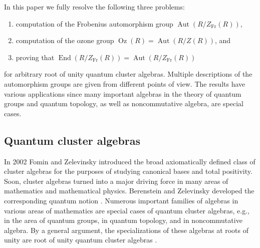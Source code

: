 \documentclass[11pt]{amsart}
\theoremstyle{plain}
\DeclareMathOperator \Aut { {\mathrm{Aut}} }
\DeclareMathOperator \Oz { {\mathrm{Oz}}}
\DeclareMathOperator \End { {\mathrm{End}} }
\DeclareMathOperator \Fr { {\mathrm{Fr}}}
\begin{document}
In this paper we fully resolve the following three problems:
\begin{enumerate}
\item computation of the Frobenius automorphism group $\Aut(R/Z_{\Fr}(R))$,
\item computation of the ozone group $\Oz(R)= \Aut(R/Z(R))$, and
\item proving that $\End(R/Z_{\Fr}(R)) = \Aut(R/Z_{\Fr}(R))$
\end{enumerate}
for arbitrary root of unity quantum cluster algebras. Multiple descriptions of the automorphism groups are given from different points of view. The results have various applications since many important algebras in the theory of quantum groups and quantum topology, as well as noncommutative algebra, are special cases. 

\subsection{Quantum cluster algebras} 
\label{1.2}
In 2002 Fomin and Zelevinsky introduced the broad axiomatically defined class of cluster algebras \cite{FZ1} for the purposes of studying canonical bases and total positivity. Soon, cluster algebras turned into a major driving force in many areas of mathematics and mathematical physics. Berenstein and Zelevinsky developed the corresponding quantum notion \cite{BerZe}. 
Numerous important families of algebras in various areas of mathematics are special cases of quantum cluster algebras, e.g., \cite{GLS,GY1,OQY26,QY} in the area of quantum groups, \cite{MaQin,M} in quantum topology, and \cite{GY0,GY2} in noncommutative algebra. By a general argument, the specializations of these algebras at roots of unity are root of unity quantum cluster algebras \cite[Theorem 5.11]{NTY2}. 
\end{document}
